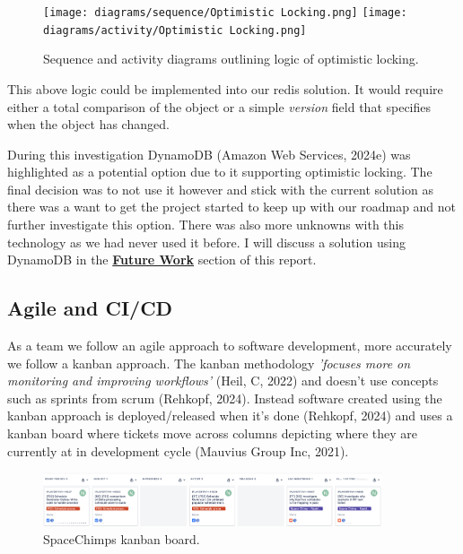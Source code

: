 \begin{itemize}
    \begin{figure}[H]
      \centering
      \texttt{[image: diagrams/sequence/Optimistic Locking.png]}
      \texttt{[image: diagrams/activity/Optimistic Locking.png]}
      \caption{Sequence and activity diagrams outlining logic of optimistic locking.}
      \label{fig:optimisticLocking}
    \end{figure}

    This above logic could be implemented into our redis solution. It would require either a total comparison of the object or a simple \textit{version}
    field that specifies when the object has changed.
  \end{itemize}

  During this investigation DynamoDB (Amazon Web Services, 2024e) was highlighted as a potential option due to it supporting optimistic
  locking. The final decision was to not use it however and stick with the current solution as there was a want to get the project started to keep 
  up with our roadmap and not further investigate this option. There was also more unknowns with this technology as we had never used it before.
  I will discuss a solution using DynamoDB in the \hyperref[sec:future]{\textbf{Future Work}} section of this report.
   
  \subsection{Agile and CI/CD}
  \label{sec:cicd}

  As a team we follow an agile approach to software development, more accurately we follow a kanban approach. The kanban methodology 
  \textit{'focuses more on monitoring and improving workflows'} (Heil, C, 2022) and doesn't use concepts such as sprints from scrum (Rehkopf, 2024). 
  Instead software created using the kanban approach is deployed/released when it's done (Rehkopf, 2024) and uses a kanban board where tickets move 
  across columns depicting where they are currently at in development cycle (Mauvius Group Inc, 2021).

  \begin{figure}[H]
    \centering
    \includegraphics[width=10cm]{assets/kanbanBoard.png}
    \caption{SpaceChimps kanban board.}
    \label{fig:kanbanBoard}
  \end{figure}

